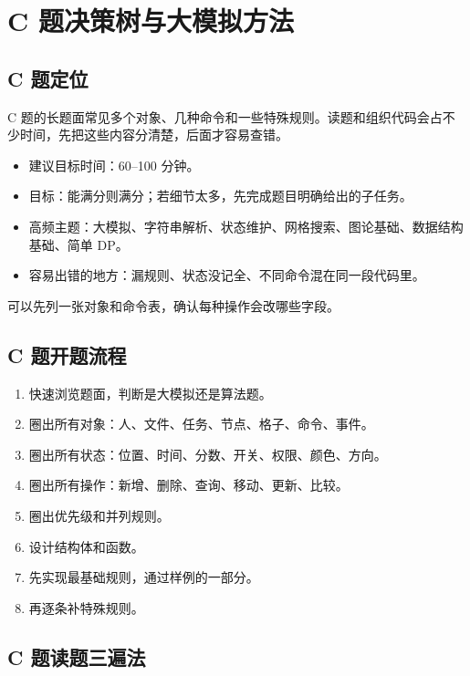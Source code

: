 \chapter{C 题决策树与大模拟方法}\label{ch:07}

\section{C 题定位}\label{sec:07-1}

C 题的长题面常见多个对象、几种命令和一些特殊规则。读题和组织代码会占不少时间，先把这些内容分清楚，后面才容易查错。

\begin{itemize}
  \item 建议目标时间：60--100 分钟。
  \item 目标：能满分则满分；若细节太多，先完成题目明确给出的子任务。
  \item 高频主题：大模拟、字符串解析、状态维护、网格搜索、图论基础、数据结构基础、简单 DP。
  \item 容易出错的地方：漏规则、状态没记全、不同命令混在同一段代码里。
\end{itemize}

可以先列一张对象和命令表，确认每种操作会改哪些字段。

\section{C 题开题流程}\label{sec:07-2}

\begin{enumerate}
  \item 快速浏览题面，判断是大模拟还是算法题。
  \item 圈出所有对象：人、文件、任务、节点、格子、命令、事件。
  \item 圈出所有状态：位置、时间、分数、开关、权限、颜色、方向。
  \item 圈出所有操作：新增、删除、查询、移动、更新、比较。
  \item 圈出优先级和并列规则。
  \item 设计结构体和函数。
  \item 先实现最基础规则，通过样例的一部分。
  \item 再逐条补特殊规则。
\end{enumerate}

\section{C 题读题三遍法}\label{sec:07-3}

